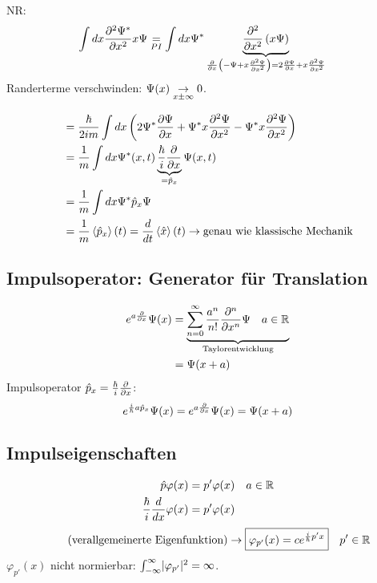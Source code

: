 \begin{eins}{NR:}
     \begin{align*}
         \int dx \frac{\partial^2 \Psi^*}{\partial x^2} x \Psi
         &\underset{PI}{=}
         \int dx \Psi^* 
         \underbrace{ \frac{\partial^2}{\partial x^2}\left( x \Psi \right)}_{\frac{\partial}{\partial x}\left( -
         \Psi + x \frac{\partial^2 \Psi}{\partial x^2}\right)  = 2 \frac{\partial \Psi}{\partial x} + x
         \frac{\partial^2 \Psi}{\partial x^2}}
     \end{align*}
     Randerterme verschwinden: $\Psi(x) \underset{x \pm \infty}{\rightarrow} 0$.
\end{eins}
\begin{align*}
     &=
     \frac{\hbar}{2im} \int dx \left( 2 \Psi^* \frac{\partial\Psi}{\partial x}
     + \Psi^* x \frac{\partial^2 \Psi}{\partial x^2}
     - \Psi^* x \frac{\partial^2 \Psi}{\partial x^2} \right) \\
     &=
     \frac{1}{m} \int dx \Psi^*(x,t) \underbrace{\frac{\hbar}{i} \frac{\partial}{\partial
     x}}_{= \hat{p}_x} \Psi(x,t) \\
     &=
     \frac{1}{m} \int dx \Psi^* \hat{p}_x \Psi \\
     &=
     \frac{1}{m} \left\langle \hat{p}_x \right\rangle (t)
     =
     \frac{d }{d t} \left\langle \hat{x} \right\rangle (t)
     \rightarrow \text{genau wie klassische Mechanik}
\end{align*}
\subsection{Impulsoperator: Generator für Translation} %
\label{sub:Impulsoperator:_Generator_für_Translation}
\begin{align*}
    e^{a \frac{\partial}{\partial x}} \Psi(x)
    &=
    \underbrace{\sum_{n=0}^\infty \frac{a^n}{n!} \frac{\partial^n}{\partial x^n} \Psi \quad a \in
    \mathbb{R}}_{\text{Taylorentwicklung}} \\
    &=
    \Psi(x+a)
\end{align*}
Impulsoperator $\hat{p}_x = \frac{\hbar}{i} \frac{\partial}{\partial x}$:
\begin{equation*}
    e^{\frac{i}{\hbar} a \hat{p}_x} \Psi(x) =
    e^{a \frac{\partial}{\partial x}} \Psi(x) = \Psi(x+a)
\end{equation*}
\subsection{Impulseigenschaften} %
\label{sub:Impulseigenschaften}
\begin{align*}
    \hat{p} \varphi(x) &= p' \varphi(x) \quad a \in \mathbb{R}\\
    \frac{\hbar}{i} \frac{d }{d x} \varphi(x) &= p' \varphi(x) \\
\end{align*}
\begin{equation*}
    \tag*{\text{(verallgemeinerte Eigenfunktion)}}
    \rar
    \boxed{
        \varphi_{p'}(x) = c e^{\frac{i}{\hb} p' x}
    }
    \quad p' \in \mathbb{R} 
\end{equation*}
$\varphi_{p'}(x)$ nicht normierbar: $\int_{-\infty}^{\infty} \lvert \varphi_{p'}
\rvert^2 = \infty$.

